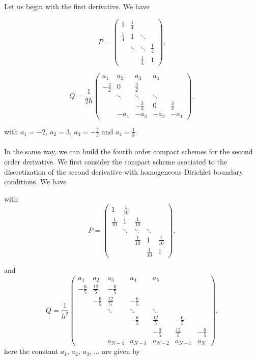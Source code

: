 \documentclass[11pt]{article}
\begin{document}
{Let us begin with the first derivative. We have

$$P=\begin{pmatrix}
1 & \frac{1}{4} &   &   \\ 
\frac{1}{4} & 1 & \ddots &   \\ 
  & \ddots & \ddots & \frac{1}{4} \\ 
  &   & \frac{1}{4} & 1
\end{pmatrix}, $$

$$Q=\dfrac{1}{2h} \begin{pmatrix}
a_1 & a_2 & a_3 & a_4 &   \\ 
-\frac{3}{2} & 0 & \frac{3}{2} &   &   \\ 
  & \ddots & \ddots & \ddots &   \\ 
  &   & -\frac{3}{2} & 0 & \frac{3}{2} \\ 
  & -a_4 & -a_3 & -a_2 & -a_1
\end{pmatrix}, $$

with $a_1=-2$, $a_2=3$, $a_3=-\frac{2}{3}$ and $a_4=\frac{1}{8}$.
\\
\\
In the same way, we can build the fourth order compact schemes for the second order derivative. We first
consider the compact scheme asociated to the discretization of the second derivative with homogeneous Dirichlet boundary conditions. We have


with
$$ P= \begin{pmatrix}
1 & \frac{1}{10} &   &   &   \\ 
\frac{1}{10} & 1 & \frac{1}{10} &   &   \\ 
  & \ddots & \ddots & \ddots &   \\ 
  &  & \frac{1}{10} & 1 & \frac{1}{10} \\ 
 &  &  & \frac{1}{10} & 1
\end{pmatrix}, $$ 


and $$ Q = \frac{1}{h^2} \begin{pmatrix}
a_1 & a_2 & a_3 & a_4 & a_5 &   &   \\ 
-\frac{6}{5} & \frac{12}{5} & -\frac{6}{5} &   &   &   &   \\ 
  & -\frac{6}{5} & \frac{12}{5} & -\frac{6}{5} &   &   &   \\ 
  &   & \ddots & \ddots & \ddots &   &   \\ 
  &   &   & -\frac{6}{5} & \frac{12}{5} & -\frac{6}{5} &   \\ 
  &   &   &   & -\frac{6}{5} & \frac{12}{5} & -\frac{6}{5} \\ 
  &   & a_{N-4} & a_{N-3} & a_{N-2} & a_{N-1} & a_N
\end{pmatrix}, $$
here the constant  $a_1$, $a_2$, $a_3$, ... are given by

}
\end{document}
